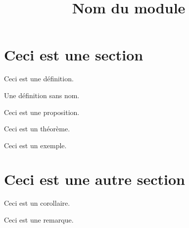 \documentclass[a4paper,9pt]{article}
\title{\vspace{-1.2cm} Nom du module}
\begin{document}
\maketitle

\vspace{-1.5cm}

\section{Ceci est une section}

	\begin{defn}
		Ceci est une définition.
	\end{defn}
	
	\begin{defn}
		Une définition sans nom.
	\end{defn}
	
	\begin{pop}
		Ceci est une proposition.
	\end{pop}

	\begin{thm}
		Ceci est un théorème.
	\end{thm}

	\begin{ex}
		Ceci est un exemple.
	\end{ex}

\section{Ceci est une autre section}

	\begin{cor}
		Ceci est un corollaire.
	\end{cor}
	
	\begin{rem}
		Ceci est une remarque.
	\end{rem}
\end{document}
